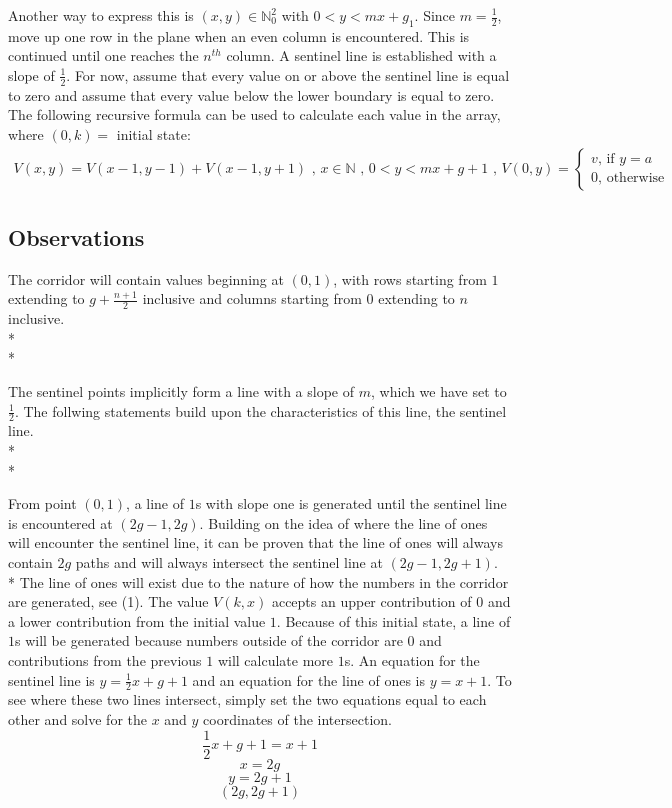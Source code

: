 \documentclass{article}
\newcommand*{\set}[1]{\mathbb{#1}}
\theoremstyle{definition}
\begin{document}
  Another way to express this is $(x,y) \in \set{N}_0^2$ with $0 < y < mx+g_1$. Since $m=\frac{1}{2}$, move up one row in the plane when an even column
  is encountered. This is continued until one reaches the $n^{th}$ column. A sentinel line is
  established with a slope of $\frac{1}{2}$. For now, assume that every value on or above the sentinel line 
  is equal to zero and assume that every value below the lower boundary is equal to zero. The following recursive formula can be used to
  calculate each value in the array, where $(0, k) = $ initial state:
	\begin{align}
		V(x,y) = V(x-1, y-1) + V(x-1,y+1)\text{ , }
		x \in \set{N} \text{ , } 0 < y < mx+g+1\text{ , }
		V(0,y) =  \begin{cases}
			v \text{, if }y=a\\
			0 \text{, otherwise}
		\end{cases}
	\end{align}
	
  \subsection*{Observations}
    \noindent The corridor will contain values beginning at $(0,1)$, with rows starting from $1$ extending to $g+ \frac{n+1}{2}$ inclusive
    and columns starting from $0$ extending to $n$ inclusive.\\*\\*
    
    \noindent The sentinel points implicitly form a line with a slope of $m$, which we have set to $\frac{1}{2}$. The follwing statements 
    build upon the characteristics of this line, the sentinel line.\\*\\*

    \noindent From point $(0, 1)$, a line of $1$s with slope one is generated until the sentinel line is encountered at $(2g-1, 2g)$.
    Building on the idea of where the line of ones will encounter the sentinel line, it can be proven that the line of ones will always contain $2g$ paths and will always 
    intersect the sentinel line at $(2g-1, 2g+1)$.\\*
    The line of ones will exist due to the nature of how the numbers in the corridor are generated, see (1). The value $V(k,x)$ accepts an upper contribution of $0$ and a
    lower contribution from the initial value $1$. Because of this initial state, a line of $1$s will be generated because numbers outside of the corridor are $0$ and 
    contributions from the previous $1$ will calculate more $1$s. An equation for the sentinel line is $y = \frac{1}{2}x+g+1$ and an equation for the line of ones 
    is $y=x+1$. To see where these two lines intersect, simply set the two equations equal to each other and solve for the $x$ and $y$ coordinates of the intersection.
    \[\frac{1}{2}x+g+1=x+1\]
    \[x = 2g\]
    \[y=2g+1\]
    \[(2g, 2g+1)\]
    
\end{document}
